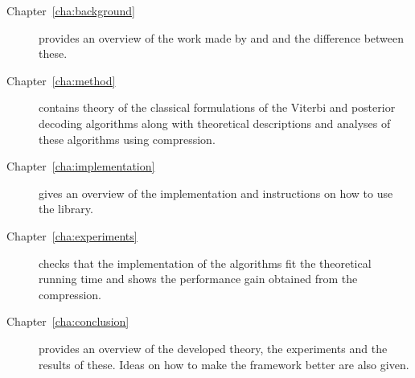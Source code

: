 \begin{description}
\item[Chapter~\ref{cha:background}] provides an overview of the work made by
  \citet{lifshits2009speeding} and \citet{sand2013ziphmmlib} and the difference
  between these.
\item[Chapter~\ref{cha:method}] contains theory of the classical formulations
  of the Viterbi and posterior decoding algorithms along with theoretical
  descriptions and analyses of these algorithms using compression.
\item[Chapter~\ref{cha:implementation}] gives an overview of the implementation
  and instructions on how to use the library.
\item[Chapter~\ref{cha:experiments}] checks that the implementation of the
  algorithms fit the theoretical running time and shows the performance gain
  obtained from the compression.
\item[Chapter~\ref{cha:conclusion}] provides an overview of the developed
  theory, the experiments and the results of these. Ideas on how to
  make the framework better are also given.
\end{description}

